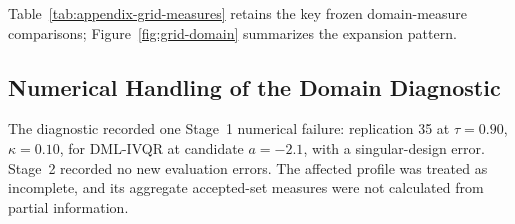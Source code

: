 Table~\ref{tab:appendix-grid-measures} retains the key frozen domain-measure comparisons; Figure~\ref{fig:grid-domain} summarizes the expansion pattern.


\clearpage

\clearpage

\subsection{Numerical Handling of the Domain Diagnostic}

The diagnostic recorded one Stage~1 numerical failure: replication 35 at $\tau=0.90$, $\kappa=0.10$, for DML-IVQR at candidate $a=-2.1$, with a singular-design error. Stage~2 recorded no new evaluation errors. The affected profile was treated as incomplete, and its aggregate accepted-set measures were not calculated from partial information.
